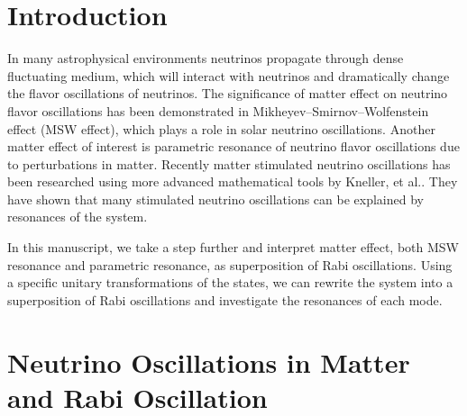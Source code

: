 \documentclass[%
preprint,
 amsmath,amssymb,
 aps,
]{revtex4-1}
\begin{document}
\maketitle


\section{\label{introduction}Introduction}

In many astrophysical environments neutrinos propagate through dense fluctuating medium, which will interact with neutrinos and dramatically change the flavor oscillations of neutrinos. The significance of matter effect on neutrino flavor oscillations has been demonstrated in Mikheyev–Smirnov–Wolfenstein effect (MSW effect), which plays a role in solar neutrino oscillations.\cite{wolf78} Another matter effect of interest is parametric resonance of neutrino flavor oscillations due to perturbations in matter.\cite{Krastev1989} Recently matter stimulated neutrino oscillations has been researched using more advanced mathematical tools by Kneller, et al..\cite{Kneller2013,Patton2014} They have shown that many stimulated neutrino oscillations can be explained by resonances of the system. 

In this manuscript, we take a step further and interpret matter effect, both MSW resonance and parametric resonance, as superposition of Rabi oscillations. Using a specific unitary transformations of the states, we can rewrite the system into a superposition of Rabi oscillations and investigate the resonances of each mode.



\section{\label{rabi}Neutrino Oscillations in Matter and Rabi Oscillation}%


\end{document}
